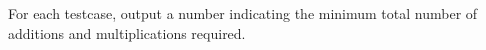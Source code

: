 For each testcase, output a number indicating the minimum total number of additions and multiplications required.
